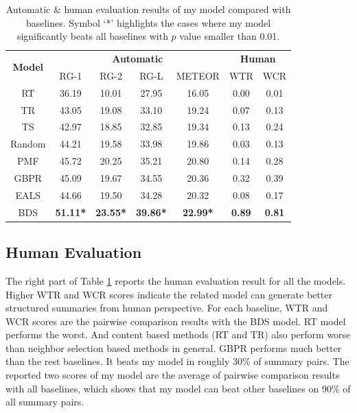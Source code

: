 \begin{table}
	
	\centering
	
	\begin{tabular}{|c|c|c|c|c|c|c|} 
		\hline
		\multirow{2}{*}{ \textbf{Model}}&  \multicolumn{4}{c|}{\textbf{Automatic}} & \multicolumn{2}{c|}{\textbf{Human }}\\ \cline{2-7}
		&RG-1&RG-2&RG-L&METEOR &WTR &WCR \\ \hline
		RT &  36.19 & 10.01 & 27.95 & 16.05& 0.00&0.01\\ 
		TR& 43.05  & 19.08 &  33.10  & 19.24 & 0.07&0.13 \\ 
		TS & 42.97  & 18.85  & 32.85  & 19.34 &0.13 &0.24 \\ 
		Random& 44.21 &  19.58 &  33.98  &  19.86 &0.03 &0.13\\ 
		PMF & 45.72 &  20.25  &  35.21  & 20.80 &0.14 & 0.28\\ 
		GBPR& 45.09 &  19.67  &  34.55&  20.36 & 0.32&0.39\\ 
		EALS& 44.66  & 19.50  &  34.28 &    20.32&0.08 &0.17\\ 
		BDS& \textbf{51.11*} & \textbf{23.55*}& \textbf{39.86*} &  \textbf{22.99* }&  \textbf{0.89 }& \textbf{0.81 }\\ \hline
	\end{tabular}
	\caption{Automatic \& human evaluation results of my model compared with baselines. Symbol ‘*’ highlights the cases where my model significantly beats all baselines with $p$ value smaller than 0.01.}
	\label{tab:auto-eval}
\end{table} 
 
\subsection{Human Evaluation}
The right part of Table \ref{tab:auto-eval} reports the human evaluation result for all the models. Higher WTR and WCR scores indicate the related model can generate better structured summaries from human perspective. For each baseline, WTR and WCR scores are the pairwise comparison results with the BDS model. RT model performs the worst.  And content based methods (RT and TR) also perform worse than neighbor selection based methods in general. GBPR performs much better than the rest baselines. It beats my model in roughly 30\% of summary pairs.  The reported two scores of my model are the average of pairwise comparison results with all baselines, which shows that my model can beat other baselines on 90\% of all summary pairs.

